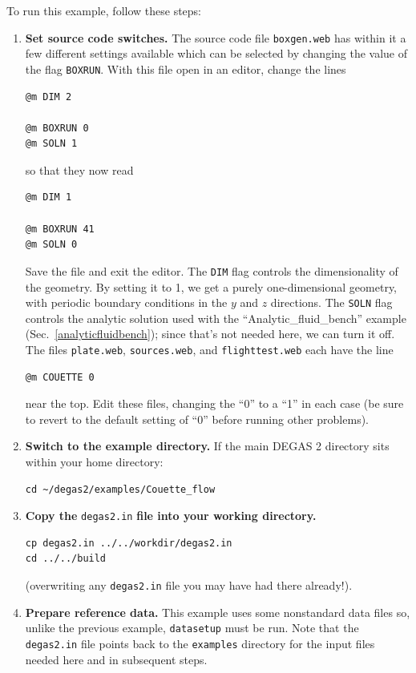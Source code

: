 \documentclass[12pt]{report}
\begin{document}
To run this example, follow these steps:
\begin{enumerate}
  \item {\bf Set source code switches.} The source code file {\tt boxgen.web}
has within it a few different settings available which can be selected
by changing the value of the flag \verb+BOXRUN+. With this file open in
an editor, change the lines
\begin{verbatim}
@m DIM 2

@m BOXRUN 0
@m SOLN 1
\end{verbatim}
so that they now read
\begin{verbatim}
@m DIM 1

@m BOXRUN 41
@m SOLN 0
\end{verbatim}
Save the file and exit the editor. The \verb+DIM+ flag controls the
dimensionality of the geometry.  By setting it to 1, we get a purely
one-dimensional geometry, with periodic boundary conditions in the $y$
and $z$ directions.  The \verb+SOLN+ flag controls the analytic 
solution used with the ``Analytic\_fluid\_bench'' example 
(Sec.~\ref{analyticfluidbench}); since that's not needed here, we can
turn it off.
The files {\tt plate.web}, {\tt sources.web}, and {\tt flighttest.web} each
have the line
\begin{verbatim}
@m COUETTE 0
\end{verbatim}
near the top. Edit these files, changing the ``0'' to a ``1'' in each case
(be sure to revert to the default setting of ``0'' before running other 
problems).
  \item {\bf Switch to the example directory.} If the main DEGAS 2 
directory sits within your home directory:
\begin{verbatim}
cd ~/degas2/examples/Couette_flow
\end{verbatim}
  \item {\bf Copy the} {\tt degas2.in} {\bf file into your working
directory.}
\begin{verbatim}
cp degas2.in ../../workdir/degas2.in
cd ../../build
\end{verbatim}
(overwriting any {\tt degas2.in} file you may have had there already!).
  \item {\bf Prepare reference data.} This example uses some nonstandard
data files so, unlike the previous example, {\tt datasetup}
must be run. Note that the {\tt degas2.in} file points back to
the {\tt examples} directory for the input files needed here and in 
subsequent steps.
\begin{verbatim}

\end{verbatim}
\end{enumerate}
\end{document}

